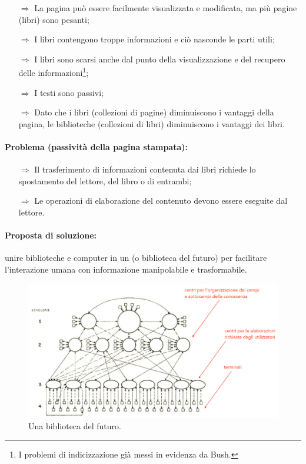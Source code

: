 \begin{itemize}
    \item [$\Rightarrow$] La pagina può essere facilmente visualizzata e modificata, ma più pagine (libri) sono pesanti;
    \item [$\Rightarrow$] I libri contengono troppe informazioni e ciò nasconde le parti utili;
    \item [$\Rightarrow$] I libri sono scarsi anche dal punto della visualizzazione e del recupero delle informazioni\footnote{I problemi di indicizzazione già messi in evidenza da Bush.};
    \item [$\Rightarrow$] I testi sono passivi;
    \item [$\Rightarrow$] Dato che i libri (collezioni di pagine) diminuiscono i vantaggi della pagina, le biblioteche (collezioni di libri) diminuiscono i vantaggi dei libri.
\end{itemize}

\paragraph{Problema (passività della pagina stampata):}
\begin{itemize}
    \item [$\Rightarrow$] Il trasferimento di informazioni contenuta dai libri richiede lo spostamento del lettore, del libro o di entrambi;
    \item [$\Rightarrow$] Le operazioni di elaborazione del contenuto devono essere eseguite dal lettore.
    
\end{itemize}

\paragraph{Proposta di soluzione:} unire biblioteche e computer in un  (o biblioteca del futuro) per facilitare
l'interazione umana con informazione manipolabile e trasformabile.

\begin{figure}[h]
    \centering
    \includegraphics[scale=0.28]{images/SistemiP.png}
    \caption{Una biblioteca del futuro.}
\end{figure}

